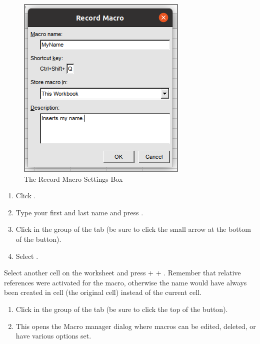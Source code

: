 \begin{figure}[H]
	\centering
	\includegraphics[width=\maxwidth{.95\linewidth}]{gfx/ch07_fig53}
	\caption{The Record Macro Settings Box}
	\label{07:fig53}
\end{figure}

\begin{enumerate}[resume]	
	\item Click .
	\item Type your first and last name and press .
	\item Click  in the  group of the  tab (be sure to click the small arrow at the bottom of the  button).
	\item Select .
\end{enumerate}

Select another cell on the worksheet and press  $ + $  $ + $ . Remember that relative references were activated for the macro, otherwise the name would have always been created in cell  (the original cell) instead of the current cell.

\begin{enumerate}
	\item Click  in the  group of the  tab (be sure to click the top of the  button).
	\item This opens the Macro manager dialog where macros can be edited, deleted, or have various options set.
\end{enumerate}

